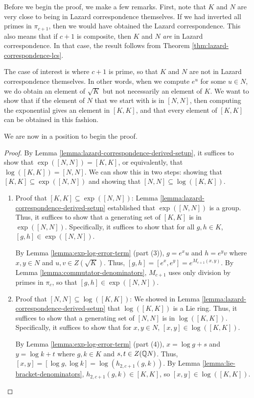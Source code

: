 Before we begin the proof, we make a few remarks. First, note that $K$
and $N$ are very close to being in Lazard correspondence
themselves. If we had inverted all primes in $\pi_{c+1}$, then we
would have obtained the Lazard correspondence. This also means that if
$c + 1$ is composite, then $K$ and $N$ {\em are} in Lazard
correspondence. In that case, the result follows from Theorem
\ref{thm:lazard-correspondence-lcs}.

The case of interest is where $c + 1$ is prime, so that $K$ and $N$
are not in Lazard correspondence themselves. In other words, when we
compute $e^u$ for some $u \in N$, we do obtain an element of
$\sqrt{K}$ but not necessarily an element of $K$. We want to show that
if the element of $N$ that we start with is in $[N,N]$, then computing
the exponential gives an element in $[K,K]$, and that every element of
$[K,K]$ can be obtained in this fashion.

We are now in a position to begin the proof.

\begin{proof}
  By Lemma \ref{lemma:lazard-correspondence-derived-setup}, it
  suffices to show that $\exp([N,N]) = [K,K]$, or equivalently, that
  $\log([K,K]) = [N,N]$. We can show this in two steps: showing that
  $[K,K] \subseteq \exp([N,N])$ and showing that $[N,N] \subseteq
  \log([K,K])$.

  \begin{enumerate}
  \item Proof that $[K,K] \subseteq \exp([N,N])$: Lemma
    \ref{lemma:lazard-correspondence-derived-setup} established that
    $\exp([N,N])$ is a group. Thus, it suffices to show that a
    generating set of $[K,K]$ is in $\exp([N,N])$. Specifically, it
    suffices to show that for all $g, h \in K$, $[g,h] \in
    \exp([N,N])$.

    By Lemma \ref{lemma:exp-log-error-term} (part (3)), $g = e^xu$ and
    $h = e^yv$ where $x,y \in N$ and $u,v \in Z(\sqrt{K})$. Thus,
    $[g,h] = [e^x,e^y] = e^{M_{c+1}(x,y)}$. By Lemma
    \ref{lemma:commutator-denominators}, $M_{c+1}$ uses only division
    by primes in $\pi_c$, so that $[g,h] \in \exp([N,N])$.

  \item Proof that $[N,N] \subseteq \log([K,K])$: We showed in Lemma
    \ref{lemma:lazard-correspondence-derived-setup} that $\log([K,K])$
    is a Lie ring. Thus, it suffices to show that a generating set of
    $[N,N]$ is in $\log([K,K])$.  Specifically, it suffices to show
    that for $x,y \in N$, $[x,y] \in \log([K,K])$.

    By Lemma \ref{lemma:exp-log-error-term} (part (4)), $x = \log g +
    s$ and $y = \log k + t$ where $g, k \in K$ and $s,t \in Z(\mathbb{Q}
    N)$. Thus, $[x,y] = [\log g, \log k] = \log(h_{2,c+1}(g,k))$. By
    Lemma \ref{lemma:lie-bracket-denominators}, $h_{2,c+1}(g,k) \in
    [K,K]$, so $[x,y] \in \log([K,K])$.
  \end{enumerate}
\end{proof}

